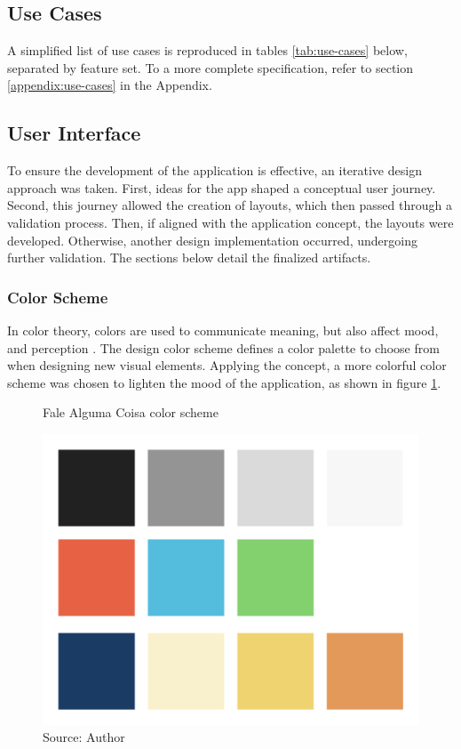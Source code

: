 \subsection{Use Cases}
\label{sec:simplified-use-cases}

A simplified list of use cases is reproduced in tables \ref{tab:use-cases} below, separated by feature set. To a more complete specification, refer to section \ref{appendix:use-cases} in the Appendix.

\clearpage
\subsection{User Interface}
\label{sec:app-user-interface}

To ensure the development of the application is effective, an iterative design approach was taken. First, ideas for the app shaped a conceptual user journey. Second, this journey allowed the creation of layouts, which then passed through a validation process. Then, if aligned with the application concept, the layouts were developed. Otherwise, another design implementation occurred, undergoing further validation. The sections below detail the finalized artifacts.

\subsubsection{Color Scheme}

In color theory, colors are used to communicate meaning, but also affect mood, and perception \cite{agoston2013color}. The design color scheme defines a color palette to choose from when designing new visual elements. Applying the concept, a more colorful color scheme was chosen to lighten the mood of the application, as shown in figure \ref{fig:falealgumacoisa-color-scheme}.

\begin{figure}[ht]
    \centering
    \caption{Fale Alguma Coisa color scheme}
     \includegraphics[width=.8\linewidth]{images/app/colors.png}
    \caption*{Source: Author}
    \label{fig:falealgumacoisa-color-scheme}
\end{figure}

